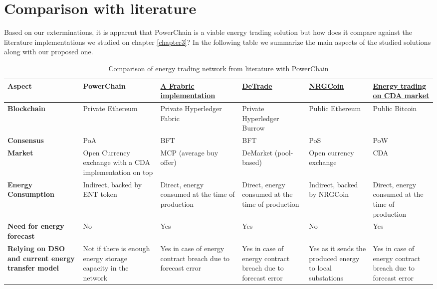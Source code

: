 \section{Comparison with literature}
Based on our exterminations, it is apparent that PowerChain is a viable energy trading solution but how does it compare against the literature implementations we studied on chapter \ref{chapter3}?
In the following table we summarize the main aspects of the studied solutions along with our proposed one.
\begin{table}[h!]
    \centering
    \begin{tabularx}{\textwidth}{|Y|Y|Y|Y|Y|Y|}
        \hline
        \textbf{Aspect}         & \textbf{PowerChain} & \textbf{\hyperref[sec:hfi]{A Frabric implementation}}      & \textbf{\hyperref[sec:dtr]{DeTrade}} & \textbf{\hyperref[sec:nrgc]{NRGCoin}} & \textbf{\hyperref[sec:cda]{Energy trading on CDA market}} \\
        \hline
        \textbf{Blockchain}     & Private Ethereum & Private Hyperledger Fabric & Private Hyperledger Burrow & Public Ethereum  & Public Bitcoin \\
        \hline
        \textbf{Consensus}      & PoA & BFT & BFT & PoS & PoW \\
        \hline
        \textbf{Market}         & Open Currency exchange with a CDA implementation on top & MCP (average buy offer) & DeMarket (pool-based) & Open currency exchange & CDA \\
        \hline
        \textbf{Energy Consumption} & Indirect, backed by ENT token & Direct, energy consumed at the time of production & Direct, energy consumed at the time of production & Indirect, backed by NRGCoin & Direct, energy consumed at the time of production \\
        \hline
        \textbf{Need for energy forecast} & No & Yes & Yes & No & Yes \\
        \hline
        \textbf{Relying on DSO and current energy transfer model} & Not if there is enough energy storage capacity in the network & Yes in case of energy contract breach due to forecast error & Yes in case of energy contract breach due to forecast error & Yes as it sends the produced energy to local substations & Yes in case of energy contract breach due to forecast error \\
        \hline
    \end{tabularx}
    \caption{Comparison of energy trading network from literature with PowerChain}
\end{table}\\ 

